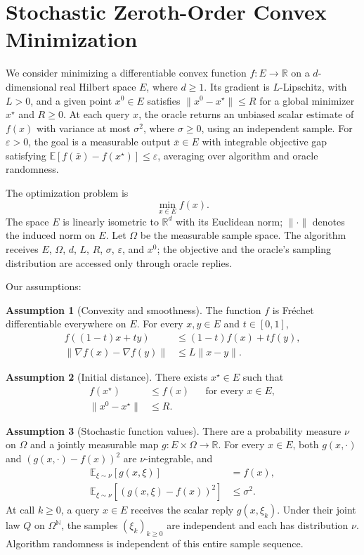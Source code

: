 \documentclass[10pt]{article}
\theoremstyle{definition}
\newtheorem{assumption}{Assumption}
\begin{document}
\section*{Stochastic Zeroth-Order Convex Minimization}
We consider minimizing a differentiable convex function $f:E\to\mathbb{R}$ on a $d$-dimensional real Hilbert space $E$, where $d\geq1$. Its gradient is $L$-Lipschitz, with $L>0$, and a given point $x^0\in E$ satisfies $\|x^0-x^\star\|\leq R$ for a global minimizer $x^\star$ and $R\geq0$. At each query $x$, the oracle returns an unbiased scalar estimate of $f(x)$ with variance at most $\sigma^2$, where $\sigma\geq0$, using an independent sample. For $\varepsilon>0$, the goal is a measurable output $\bar{x}\in E$ with integrable objective gap satisfying $\mathbb{E}[f(\bar{x})-f(x^\star)]\leq\varepsilon$, averaging over algorithm and oracle randomness.

The optimization problem is
\[
\min_{x\in E} f(x).
\]
The space $E$ is linearly isometric to $\mathbb{R}^d$ with its Euclidean norm; $\|\cdot\|$ denotes the induced norm on $E$. Let $\Omega$ be the measurable sample space. The algorithm receives $E$, $\Omega$, $d$, $L$, $R$, $\sigma$, $\varepsilon$, and $x^0$; the objective and the oracle's sampling distribution are accessed only through oracle replies.

Our assumptions:
\begin{assumption}[Convexity and smoothness]
The function $f$ is Fr\'echet differentiable everywhere on $E$. For every $x,y\in E$ and $t\in[0,1]$,
\[
\begin{aligned}
f((1-t)x+ty)&\leq (1-t)f(x)+t f(y),\\
\|\nabla f(x)-\nabla f(y)\|&\leq L\|x-y\|.
\end{aligned}
\]
\end{assumption}

\begin{assumption}[Initial distance]
There exists $x^\star\in E$ such that
\[
\begin{aligned}
f(x^\star)&\leq f(x) &&\text{for every }x\in E,\\
\|x^0-x^\star\|&\leq R.
\end{aligned}
\]
\end{assumption}

\begin{assumption}[Stochastic function values]
There are a probability measure $\nu$ on $\Omega$ and a jointly measurable map $g:E\times\Omega\to\mathbb{R}$. For every $x\in E$, both $g(x,\cdot)$ and $(g(x,\cdot)-f(x))^2$ are $\nu$-integrable, and
\[
\begin{aligned}
\mathbb{E}_{\xi\sim\nu}[g(x,\xi)]&=f(x),\\
\mathbb{E}_{\xi\sim\nu}[(g(x,\xi)-f(x))^2]&\leq\sigma^2.
\end{aligned}
\]
At call $k\geq0$, a query $x\in E$ receives the scalar reply $g(x,\xi_k)$. Under their joint law $Q$ on $\Omega^{\mathbb{N}}$, the samples $(\xi_k)_{k\geq0}$ are independent and each has distribution $\nu$. Algorithm randomness is independent of this entire sample sequence.
\end{assumption}
\end{document}
